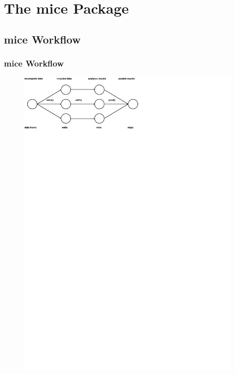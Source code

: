 \documentclass[UKenglish
  pdftex                    %
  dvipsnames                %
]{beamer}
\newcommand{\pk}[1]{\textcolor{Rblue}{\textsf{#1}}}
\begin{document}
\section{The \pk{mice} Package}

\subsection{\pk{mice} Workflow}
\begin{frame}\frametitle{\pk{mice} Workflow \small\parencite{vanbuuren:2011}}

\begin{figure}
  \centering
  \includegraphics[width=\textwidth]{./Figures/sketch.pdf}
\end{figure}

\end{frame}
\end{document}
